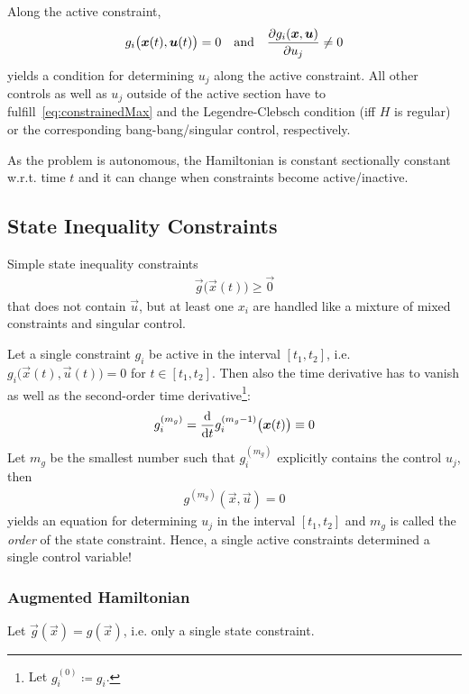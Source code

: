 				Along the active constraint,
				\begin{align*}
					g_i\big(\bm{x}(t), \bm{u}(t)\big) = 0 \quad\text{and}\quad \pdv{g_i(\bm{x}, \bm{u})}{u_j} \neq 0
				\end{align*}
				yields a condition for determining \(u_j\) along the active constraint. All other controls as well as \(u_j\) outside of the active section have to fulfill~\eqref{eq:constrainedMax} and the Legendre-Clebsch condition (iff \(H\) is regular) or the corresponding bang-bang/singular control, respectively.

				As the problem is autonomous, the Hamiltonian is constant sectionally constant w.r.t. time \(t\) and it can change when constraints become active/inactive.

		\subsection{State Inequality Constraints}
			Simple state inequality constraints
			\begin{align*}
				\vec{g}\big(\vec{x}(t)\big) \geq \vec{0}
			\end{align*}
			that does not contain \(\vec{u}\), but at least one \(x_i\) are handled like a mixture of mixed constraints and singular control.

			Let a single constraint \( g_i \) be active in the interval \( [t_1, t_2] \), i.e. \( g_i\big(\vec{x}(t), \vec{u}(t)\big) = 0 \) for \( t \in [t_1, t_2] \). Then also the time derivative has to vanish as well as the second-order time derivative\footnote{Let \( g_i^{(0)} \coloneqq g_i \).}:
			\begin{align*}
				g_i^{(m_g)} = \dv{t} g_i^{(m_g - 1)}\big(\bm{x}(t)\big) \equiv 0
			\end{align*}
			Let \(m_g\) be the smallest number such that \( g_i^{(m_g)} \) explicitly contains the control \(u_j\), then
			\begin{align*}
				g^{(m_g)}(\vec{x}, \vec{u}) = 0
			\end{align*}
			yields an equation for determining \( u_j \) in the interval \( [t_1, t_2] \) and \(m_g\) is called the \emph{order} of the state constraint. Hence, a single active constraints determined a single control variable!

			\subsubsection{Augmented Hamiltonian}
				Let \( \vec{g}(\vec{x}) = g(\vec{x}) \), i.e. only a single state constraint.

